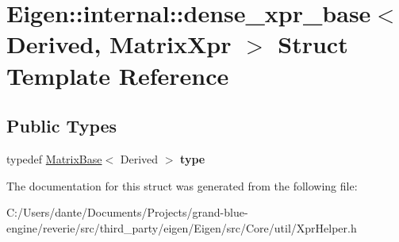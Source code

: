 \hypertarget{struct_eigen_1_1internal_1_1dense__xpr__base_3_01_derived_00_01_matrix_xpr_01_4}{}\section{Eigen\+::internal\+::dense\+\_\+xpr\+\_\+base$<$ Derived, Matrix\+Xpr $>$ Struct Template Reference}
\label{struct_eigen_1_1internal_1_1dense__xpr__base_3_01_derived_00_01_matrix_xpr_01_4}
\subsection*{Public Types}
\begin{DoxyCompactItemize}
\item 
\mbox{\label{struct_eigen_1_1internal_1_1dense__xpr__base_3_01_derived_00_01_matrix_xpr_01_4_a08a7453d950a372ef30fc1a1fdfc93ff}} 
typedef \mbox{\hyperlink{class_eigen_1_1_matrix_base}{Matrix\+Base}}$<$ Derived $>$ {\bfseries type}
\end{DoxyCompactItemize}


The documentation for this struct was generated from the following file\+:\begin{DoxyCompactItemize}
\item 
C\+:/\+Users/dante/\+Documents/\+Projects/grand-\/blue-\/engine/reverie/src/third\+\_\+party/eigen/\+Eigen/src/\+Core/util/Xpr\+Helper.\+h\end{DoxyCompactItemize}
